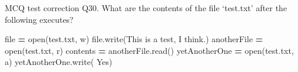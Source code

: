\documentclass[
  8pt,
  ignorenonframetext,
]{beamer}
\newenvironment{Shaded}{\begin{snugshade}}{\end{snugshade}}
\newcommand{\BuiltInTok}[1]{#1}
\newcommand{\NormalTok}[1]{#1}
\newcommand{\OperatorTok}[1]{\textcolor[rgb]{0.81,0.36,0.00}{\textbf{#1}}}
\newcommand{\StringTok}[1]{\textcolor[rgb]{0.31,0.60,0.02}{#1}}
\begin{document}
\begin{frame}[fragile]{MCQ test correction}
\protect\hypertarget{mcq-test-correction-58}{}
Q30. What are the contents of the file `test.txt' after the following
executes?

\begin{Shaded}
\begin{Highlighting}[]
\BuiltInTok{file} \OperatorTok{=} \BuiltInTok{open}\NormalTok{(}\StringTok{\textquotesingle{}test.txt\textquotesingle{}}\NormalTok{, }\StringTok{\textquotesingle{}w\textquotesingle{}}\NormalTok{)}
\BuiltInTok{file}\NormalTok{.write(}\StringTok{\textquotesingle{}This is a test, I think.\textquotesingle{}}\NormalTok{)}
\NormalTok{anotherFile }\OperatorTok{=} \BuiltInTok{open}\NormalTok{(}\StringTok{\textquotesingle{}test.txt\textquotesingle{}}\NormalTok{, }\StringTok{\textquotesingle{}r\textquotesingle{}}\NormalTok{)}
\NormalTok{contents }\OperatorTok{=}\NormalTok{ anotherFile.read()}
\NormalTok{yetAnotherOne }\OperatorTok{=} \BuiltInTok{open}\NormalTok{(}\StringTok{\textquotesingle{}test.txt\textquotesingle{}}\NormalTok{, }\StringTok{\textquotesingle{}a\textquotesingle{}}\NormalTok{)}
\NormalTok{yetAnotherOne.write(}\StringTok{\textquotesingle{} Yes\textquotesingle{}}\NormalTok{)}
\end{Highlighting}
\end{Shaded}
\end{frame}
\end{document}
